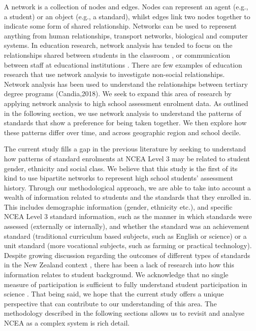 \documentclass[a4paper]{article}
\begin{document}
A network is a collection of nodes and edges. Nodes can represent an agent (e.g., a student) or an object (e.g., a standard), whilst edges link two nodes together to indicate some form of shared relationship. Networks can be used to represent anything from human relationships, transport networks, biological and computer systems. In education research, network analysis has tended to focus on the relationships shared between students in the classroom \cite{tranmer2014multiple}, or communication between staff at educational institutions \cite{daly2010social}. There are few examples of education research that use network analysis to investigate non-social relationships. Network analysis has been used to understand the relationships between tertiary degree programs (Candia,2018). We seek to expand this area of research by applying network analysis to high school assessment enrolment data. As outlined in the following section, we use network analysis to understand the patterns of standards that show a preference for being taken together. We then explore how these patterns differ over time, and across geographic region and school decile.

The current study fills a gap in the previous literature by seeking to understand how patterns of standard enrolments at NCEA Level 3 may be related to student gender, ethnicity and social class. We believe that this study is the first of its kind to use bipartite networks to represent high school students' assessment history. Through our methodological approach, we are able to take into account a wealth of information related to students and the standards that they enrolled in. This includes demographic information (gender, ethnicity etc.), and specific NCEA Level 3 standard information, such as the manner in which standards were assessed (externally or internally), and whether the standard was an achievement standard (traditional curriculum based subjects, such as English or science) or a unit standard (more vocational subjects, such as farming or practical technology). Despite growing discussion regarding the outcomes of different types of standards in the New Zealand context \cite{hipkins2016ncea,Lipson2017}, there has been a lack of research into how this information relates to student background. We acknowledge that no single measure of participation is sufficient to fully understand student participation in science \cite{hipkins2005staying}. That being said, we hope that the current study offers a unique perspective that can contribute to our understanding of this area. The methodology described in the following sections allows us to revisit and analyse NCEA as a complex system is rich detail. 
\end{document}
